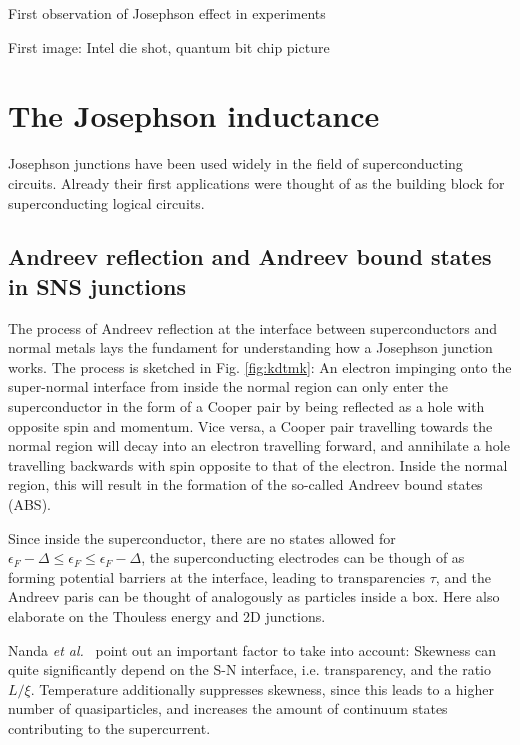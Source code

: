 First observation of Josephson effect in experiments~\cite{andersonProbableObservationJosephson1963}

First image: Intel die shot, quantum bit chip picture

\section{The Josephson inductance}

Josephson junctions have been used widely in the field of superconducting circuits.
%
Already their first applications were thought of as the building block for superconducting logical circuits.

\subsection{Andreev reflection and Andreev bound states in SNS junctions}

The process of Andreev reflection at the interface between superconductors and normal metals lays the fundament for understanding how a Josephson junction works.
%
The process is sketched in Fig. \ref{fig:kdtmk}:
%
An electron impinging onto the super-normal interface from inside the normal region can only enter the superconductor in the form of a Cooper pair by being reflected as a hole with opposite spin and momentum.
%
Vice versa, a Cooper pair travelling towards the normal region will decay into an electron travelling forward, and annihilate a hole travelling backwards with spin opposite to that of the electron.
%
Inside the normal region, this will result in the formation of the so-called Andreev bound states (ABS).

Since inside the superconductor, there are no states allowed for $\epsilon_F - \Delta \leq \epsilon_F \leq \epsilon_F - \Delta$, the superconducting electrodes can be though of as forming potential barriers at the interface, leading to transparencies $\tau$, and the Andreev paris can be thought of analogously as particles inside a box.
%
Here also elaborate on the Thouless energy and 2D junctions.

Nanda \textit{et al.}~\cite{nandaCurrentPhaseRelationBallistic2017} point out an important factor to take into account:
%
Skewness can quite significantly depend on the S-N interface, i.e. transparency, and the ratio $L/\xi$.
%
Temperature additionally suppresses skewness, since this leads to a higher number of quasiparticles, and increases the amount of continuum states contributing to the supercurrent.

